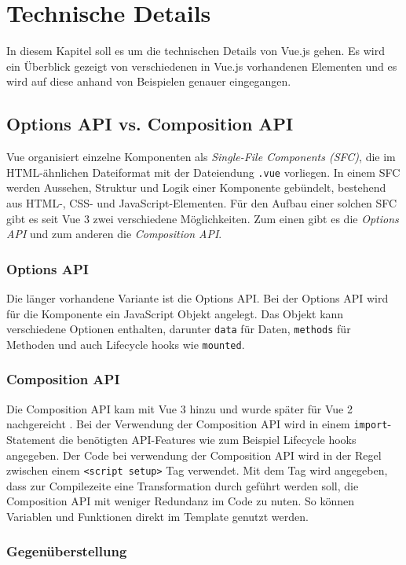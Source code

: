 
\chapter{Technische Details}
In diesem Kapitel soll es um die technischen Details von Vue.js gehen.
Es wird ein Überblick gezeigt von verschiedenen in Vue.js vorhandenen Elementen
und es wird auf diese anhand von Beispielen genauer eingegangen.

\section{Options API vs. Composition API}\label{sec:options-api-and-composition-api}
Vue organisiert einzelne Komponenten als \emph{Single-File Components (SFC)},
die im HTML-ähnlichen Dateiformat mit der Dateiendung \lstinline{.vue} vorliegen.
In einem SFC werden Aussehen, Struktur und Logik einer Komponente gebündelt, bestehend aus HTML-, CSS- und JavaScript-Elementen.
Für den Aufbau einer solchen SFC gibt es seit Vue 3 zwei verschiedene Möglichkeiten.
Zum einen gibt es die \emph{Options API} und zum anderen die \emph{Composition API}.
\subsection*{Options API}
Die länger vorhandene Variante ist die Options API.
Bei der Options API wird für die Komponente ein JavaScript Objekt angelegt.
Das Objekt kann verschiedene Optionen enthalten, darunter \lstinline{data} für Daten, \lstinline{methods} für Methoden und auch Lifecycle hooks wie \lstinline{mounted}.

\subsection*{Composition API}
Die Composition API kam mit Vue 3 hinzu und wurde später für Vue 2 nachgereicht \cite{vueFAQ}.
Bei der Verwendung der Composition API wird in einem \lstinline{import}-Statement
die benötigten API-Features wie zum Beispiel Lifecycle hooks angegeben.
Der Code bei verwendung der Composition API wird in der Regel zwischen einem \lstinline{<script setup>} Tag verwendet.
Mit dem Tag wird angegeben, dass zur Compilezeite eine Transformation durch geführt werden soll,
die Composition API mit weniger Redundanz im Code zu nuten.
So können Variablen und Funktionen direkt im Template genutzt werden.

\subsection*{Gegenüberstellung}

